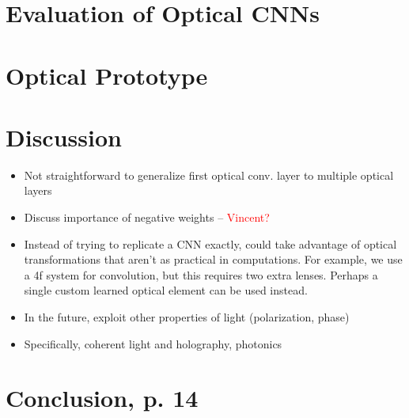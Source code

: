 \documentclass[runningheads]{llncs}
\newcommand{\red}[1]{\textcolor{red}{#1}}
\begin{document}
\section{Evaluation of Optical CNNs}
\label{sec:simulations}


\section{Optical Prototype}
\label{sec:prototype}


\section{Discussion}
\label{sec:discussion}
\begin{itemize}
\item Not straightforward to generalize first optical conv. layer to multiple optical layers
\item Discuss importance of negative weights – \red{Vincent?}
\item Instead of trying to replicate a CNN exactly, could take advantage of optical transformations that aren't as practical in computations. For example, we use a 4f system for convolution, but this requires two extra lenses. Perhaps a single custom learned optical element can be used instead.
\item In the future, exploit other properties of light (polarization, phase)	
\item Specifically, coherent light and holography, photonics
\end{itemize}

\section{Conclusion, p. 14}
\label{sec:conclusion}


\clearpage



\end{document}
